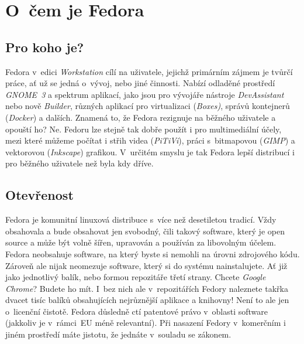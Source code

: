 \chapter*{O~čem je Fedora}
\section*{Pro koho je?}
Fedora v~edici \emph{Workstation} cílí na uživatele, jejichž primárním zájmem je tvůrčí práce, ať už se jedná o~vývoj, nebo jiné činnosti. Nabízí odladěné prostředí \emph{GNOME~3} a spektrum aplikací, jako jsou pro vývojáře nástroje \emph{DevAssistant} nebo nově \emph{Builder}, různých aplikací pro virtualizaci (\emph{Boxes)}, správů kontejnerů (\emph{Docker}) a dalších. Znamená to, že Fedora rezignuje na běžného uživatele a opouští ho? Ne. Fedoru lze stejně tak dobře použít i pro multimediální účely, mezi které můžeme počítat i střih videa (\emph{PiTiVi}), práci s~bitmapovou (\emph{GIMP}) a vektorovou (\emph{Inkscape}) grafikou. V~určitém smyslu je tak Fedora lepší distribucí i pro běžného uživatele než byla kdy dříve. 

\section*{Otevřenost}
Fedora je komunitní linuxová distribuce s~více než desetiletou tradicí. Vždy obsahovala a bude obsahovat jen svobodný, čili takový software, který je open source a může být volně šířen, upravován a používán za libovolným účelem. Fedora neobsahuje software, na který byste si nemohli  na úrovni zdrojového kódu. Zároveň ale nijak neomezuje software, který si do systému nainstalujete. Ať již jako jednotlivý balík, nebo formou repozitáře třetí strany. Chcete \emph{Google Chrome}? Budete ho mít. I~bez nich ale v~repozitářích Fedory naleznete takřka dvacet tisíc balíků obsahujících nejrůznější aplikace a knihovny! Není to ale jen o~licenční čistotě. Fedora důsledně ctí patentové právo v~oblasti software (jakkoliv je v~rámci~EU méně relevantní). Při nasazení Fedory v~komerčním i jiném prostředí máte jistotu, že jednáte v~souladu se zákonem.

